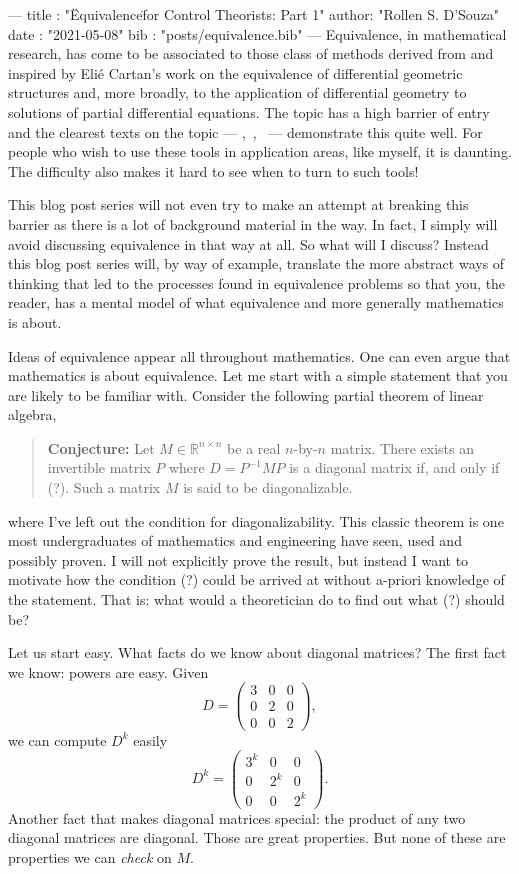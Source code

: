 ---
title :   "\"Equivalence\" for Control Theorists: Part 1"
author:   "Rollen S. D'Souza"
date  :   "2021-05-08"
bib   :   "posts/equivalence.bib"
---
Equivalence, in mathematical research, has come to be associated to those class of methods derived from and inspired by Eli\'e Cartan's work on the equivalence of differential geometric structures and, more broadly, to the application of differential geometry to solutions of partial differential equations.
The topic has a high barrier of entry and the clearest texts on the topic --- \cite{Bryant1999},~\cite{Olver1995},~\cite{Gardner1989} --- demonstrate this quite well.
For people who wish to use these tools in application areas, like myself, it is daunting.
The difficulty also makes it hard to see when to turn to such tools!

This blog post series will not even try to make an attempt at breaking this barrier as there is a lot of background material in the way.
In fact, I simply will avoid discussing equivalence in that way at all.
So what will I discuss?
Instead this blog post series will, by way of example, translate the more abstract ways of thinking that led to the processes found in equivalence problems so that you, the reader, has a mental model of what equivalence and more generally mathematics is about.

Ideas of equivalence appear all throughout mathematics.
One can even argue that mathematics is about equivalence.
Let me start with a simple statement that you are likely to be familiar with.
Consider the following partial theorem of linear algebra,
%
\begin{quote}
  \textbf{Conjecture:} Let \(M \in \mathbb{R}^{n\times n}\) be a real \(n\)-by-\(n\) matrix.
  There exists an invertible matrix \(P\) where \(D = P^{-1} M P\) is a diagonal matrix if, and only if (?).
  Such a matrix \(M\) is said to be diagonalizable.
\end{quote}
%
where I've left out the condition for diagonalizability.
This classic theorem is one most undergraduates of mathematics and engineering have seen, used and possibly proven.
I will not explicitly prove the result, but instead I want to motivate how the condition (?) could be arrived at without a-priori knowledge of the statement.
That is: what would a theoretician do to find out what (?) should be?

Let us start easy.
What facts do we know about diagonal matrices?
The first fact we know: powers are easy.
Given
\[
  D = \begin{pmatrix} 3 & 0 & 0 \\ 0 & 2 & 0 \\ 0 & 0 & 2 \end{pmatrix},
\]
we can compute \(D^k\) easily
\[
  D^k = \begin{pmatrix} 3^k & 0 & 0 \\ 0 & 2^k & 0 \\ 0 & 0 & 2^k \end{pmatrix}.
\]
Another fact that makes diagonal matrices special: the product of any two diagonal matrices are diagonal.
Those are great properties.
But none of these are properties we can \emph{check} on \(M.\)

